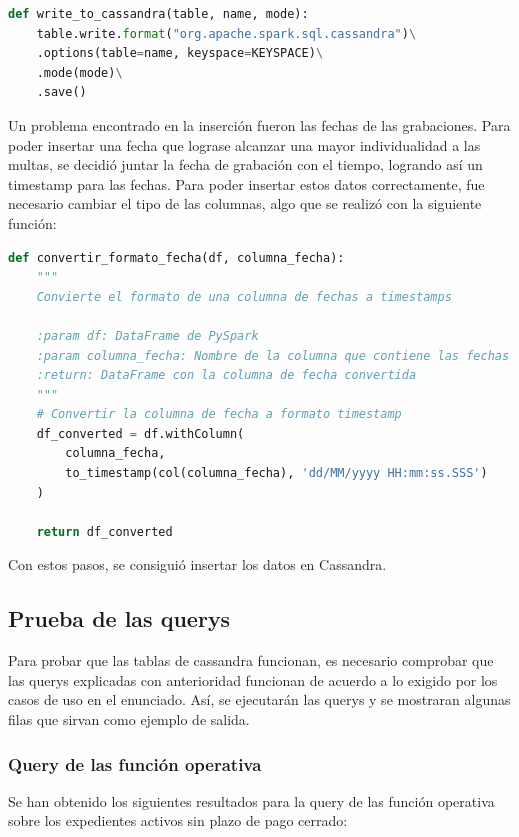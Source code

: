 \documentclass[]{article}
\begin{document}
\begin{lstlisting}[language=python, caption=Carga de datos en PySpark]
def write_to_cassandra(table, name, mode):
    table.write.format("org.apache.spark.sql.cassandra")\
    .options(table=name, keyspace=KEYSPACE)\
    .mode(mode)\
    .save()
\end{lstlisting}

Un problema encontrado en la inserción fueron las fechas de las grabaciones. Para poder insertar una fecha que lograse alcanzar una mayor individualidad a las multas, se decidió juntar la fecha de grabación con el tiempo, logrando así un timestamp para las fechas. Para poder insertar estos datos correctamente, fue necesario cambiar el tipo de las columnas, algo que se realizó con la siguiente función:

\begin{lstlisting}[language=python, caption=Carga de datos en PySpark]
def convertir_formato_fecha(df, columna_fecha):
    """
    Convierte el formato de una columna de fechas a timestamps

    :param df: DataFrame de PySpark
    :param columna_fecha: Nombre de la columna que contiene las fechas a convertir
    :return: DataFrame con la columna de fecha convertida
    """
    # Convertir la columna de fecha a formato timestamp
    df_converted = df.withColumn(
        columna_fecha,
        to_timestamp(col(columna_fecha), 'dd/MM/yyyy HH:mm:ss.SSS')
    )

    return df_converted
\end{lstlisting}

Con estos pasos, se consiguió insertar los datos en Cassandra.

\subsection{Prueba de las querys}
Para probar que las tablas de cassandra funcionan, es necesario comprobar que las querys explicadas con anterioridad funcionan de acuerdo a lo exigido por los casos de uso en el enunciado. Así, se ejecutarán las querys y se mostraran algunas filas que sirvan como ejemplo de salida.

\subsubsection{Query de las función operativa}
Se han obtenido los siguientes resultados para la query de las función operativa sobre los expedientes activos sin plazo de pago cerrado:
\end{document}
